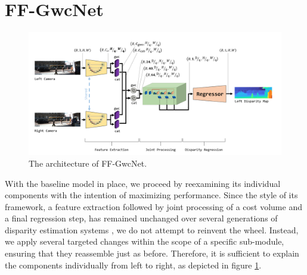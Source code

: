 \documentclass[runningheads]{llncs}
\begin{document}
\section{FF-GwcNet}
\begin{figure}[h]
\vspace{-1px}
  \centering
    \includegraphics[width=0.99\linewidth]{images/Custom Model Pipeline.png}
    \caption{The architecture of FF-GwcNet.}
    \label{Fig:Custom_Model_Overview}
\end{figure}

With the baseline model in place, we proceed by reexamining its individual components with the intention of maximizing performance. Since the style of its framework, a feature extraction followed by joint processing of a cost volume and a final regression step, has remained unchanged over several generations of disparity estimation systems \cite{Cost_Volume, PSM-Net, guo2019groupwise, Wasserstein_Dist_Disp_Estimation}, we do not attempt to reinvent the wheel. Instead, we apply several targeted changes within the scope of a specific sub-module, ensuring that they reassemble just as before. Therefore, it is sufficient to explain the components individually from left to right, as depicted in figure \ref{Fig:Custom_Model_Overview}.
\end{document}
